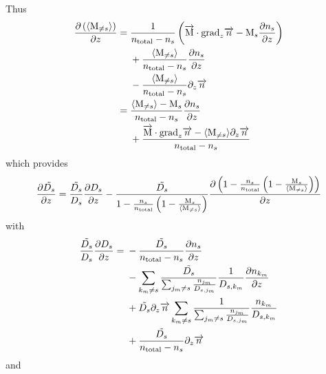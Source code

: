 Thus
\begin{equation}
\begin{split}
\frac{\partial\left(\langle\text{M}_{\neq s}\rangle\right)}{\partial z} = 
        &\;   \frac{1}{n_\text{total} - n_s}\left( \overrightarrow{\text{M}}\cdot\text{grad}_{z}\overrightarrow{n} - \text{M}_s\frac{\partial n_s}{\partial z}\right) \\
        &\;  + \frac{\langle\text{M}_{\neq s}\rangle}{n_\text{total} - n_s} \frac{\partial n_s}{\partial z} \\
        &\;  - \frac{\langle\text{M}_{\neq s}\rangle}{n_\text{total} - n_s} \partial_{z}{\overrightarrow{n}} \\
=       &\;    \frac{\langle\text{M}_{\neq s}\rangle - \text{M}_s}{n_\text{total} - n_s} \frac{\partial n_s}{\partial z} \\
        &\;  + \frac{\overrightarrow{\text{M}}\cdot\text{grad}_{z}\overrightarrow{n} - \langle\text{M}_{\neq s}\rangle \partial_{z}{\overrightarrow{n}}}{n_\text{total} - n_s}
\end{split}
\end{equation}
which provides
\begin{equation}
\frac{\partial\tilde{D_s}}{\partial z}  = \frac{\tilde{D_s}}{D_s}\frac{\partial D_s}{\partial z}
                             - \frac{\tilde{D_s}}{1-\frac{n_s}{n_\text{total}}\left(1 - \frac{\text{M}_s}{\langle\text{M}_{\neq s}\rangle}\right)}
                                \frac{\partial\left(1-\frac{n_s}{n_\text{total}}\left(1 - \frac{\text{M}_s}{\langle\text{M}_{\neq s}\rangle}\right)\right)}{\partial z}
\end{equation}
with
\begin{equation}
\begin{split}
\frac{\tilde{D_s}}{D_s}\frac{\partial D_s}{\partial z}
                  = &\; - \frac{\tilde{D_s}}{n_\text{total} - n_s}\frac{\partial n_s}{\partial z} \\
                    &\; - \sum_{k_m\neq s}\frac{\tilde{D_s}}{\sum_{j_m \neq s}\frac{n_{j_m}}{D_{s,j_m}}}
                                \frac{1}{D_{s,k_m}} \frac{\partial n_{k_m}}{\partial z} \\
                    &\; +  \tilde{D_s}\partial_{z}{\overrightarrow{n}} \sum_{k_m\neq s}
                           \frac{1}{\sum_{j_m \neq s}\frac{n_{j_m}}{D_{s,j_m}}}
                                    \frac{n_{k_m}}{D_{s,k_m}} \\
                    &\; + \frac{\tilde{D_s}}{n_\text{total} - n_s}\partial_{z}{\overrightarrow{n}} \\
\end{split}
\end{equation}
and
